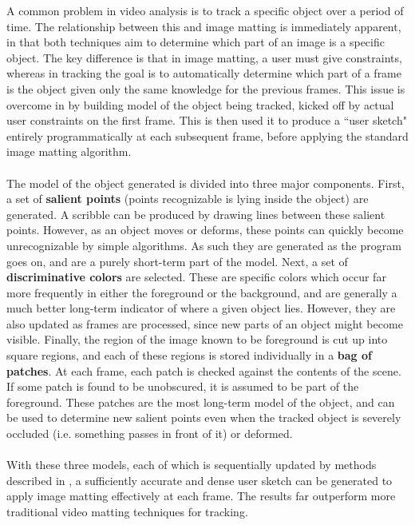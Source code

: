 A common problem in video analysis is to track a specific object over a period of time. The relationship between this and image matting is immediately apparent, in that both techniques aim to determine which part of an image is a specific object. The key difference is that in image matting, a user must give constraints, whereas in tracking the goal is to automatically determine which part of a frame is the object given only the same knowledge for the previous frames. This issue is overcome in \cite{fan10} by building model of the object being tracked, kicked off by actual user constraints on the first frame. This is then used it to produce a ``user sketch" entirely programmatically at each subsequent frame, before applying the standard image matting algorithm.
\\\\
The model of the object generated is divided into three major components. First, a set of \textbf{salient points} (points recognizable is lying inside the object) are generated. A scribble can be produced by drawing lines between these salient points. However, as an object moves or deforms, these points can quickly become unrecognizable by simple algorithms. As such they are generated as the program goes on, and are a purely short-term part of the model. Next, a set of \textbf{discriminative colors} are selected. These are specific colors which occur far more frequently in either the foreground or the background, and are generally a much better long-term indicator of where a given object lies. However, they are also updated as frames are processed, since new parts of an object might become visible. Finally, the region of the image known to be foreground is cut up into square regions, and each of these regions is stored individually in a \textbf{bag of patches}. At each frame, each patch is checked against the contents of the scene. If some patch is found to be unobscured, it is assumed to be part of the foreground. These patches are the most long-term model of the object, and can be used to determine new salient points even when the tracked object is severely occluded (i.e. something passes in front of it) or deformed.
\\\\
With these three models, each of which is sequentially updated by methods described in \cite{fan10}, a sufficiently accurate and dense user sketch can be generated to apply image matting effectively at each frame. The results far outperform more traditional video matting techniques for tracking.